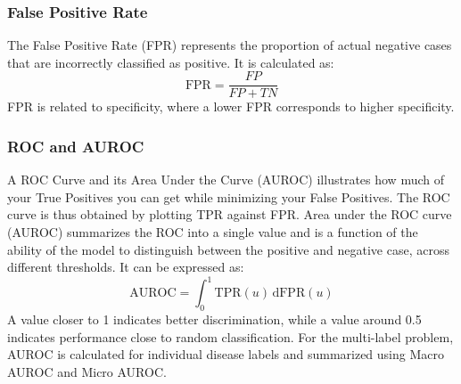 \documentclass[conference]{IEEEtran}
\begin{document}
\subsubsection{False Positive Rate}
The False Positive Rate (FPR) represents the proportion of actual negative cases that are incorrectly classified as positive. It is calculated as:
\begin{equation}
\mathrm{FPR}
=
\frac{FP}{FP+TN}
\end{equation}
FPR is related to specificity, where a lower FPR corresponds to higher specificity.
\subsubsection{ROC and AUROC}
A ROC Curve and its Area Under the Curve (AUROC) illustrates how much of your True Positives you can get while minimizing your False Positives. The ROC curve is thus obtained by plotting TPR against FPR. Area under the ROC curve (AUROC) summarizes the ROC into a single value and is a function of the ability of the model to distinguish between the positive and negative case, across different thresholds. It can be expressed as:
\begin{equation}
\mathrm{AUROC}
=
\int_{0}^{1}
\mathrm{TPR}(u)\,
\mathrm{d}\mathrm{FPR}(u)
\end{equation}
A value closer to 1 indicates better discrimination, while a value around 0.5 indicates performance close to random classification.
For the multi-label problem, AUROC is calculated for individual disease labels and summarized using Macro AUROC and Micro AUROC.
\end{document}
